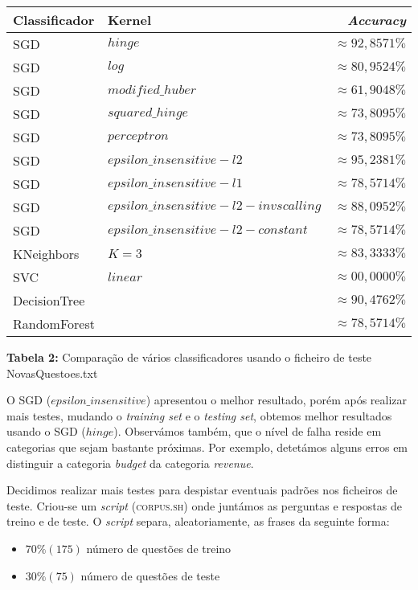 \documentclass[12pt]{article}
\begin{document}
\begin{center}
    \begin{tabular}{ l | l | r }
      \hline
      \textbf{Classificador} & \textbf{Kernel} & \textbf{\textit{Accuracy}} \\ \hline
      SGD & $hinge$ & $\approx 92,8571\%$ \\ \hline
      SGD & $log$ & $\approx 80,9524\%$ \\ \hline
      SGD & $modified\_huber$ & $\approx 61,9048\%$ \\ \hline
      SGD & $squared\_hinge$ & $\approx 73,8095\%$ \\ \hline
      SGD & $perceptron$ & $\approx 73,8095\%$ \\ \hline
      SGD & $epsilon\_insensitive-l2$ & $\approx 95,2381\%$ \\ \hline
      SGD & $epsilon\_insensitive-l1$ & $\approx 78,5714\%$ \\ \hline
      SGD & $epsilon\_insensitive-l2-invscalling$ & $\approx 88,0952\%$ \\ \hline
      SGD & $epsilon\_insensitive-l2-constant$ & $\approx 78,5714\%$ \\ \hline
      KNeighbors & $K = 3$ & $\approx 83,3333\%$ \\ \hline
      SVC & $linear$ & $\approx 00,0000\%$ \\ \hline
      DecisionTree & $ $ & $\approx 90,4762\%$ \\ \hline
      RandomForest & $ $ & $\approx 78,5714\%$ \\ \hline
      
      
    \end{tabular}
  \end{center}
  \textbf{Tabela 2:} Comparação de vários classificadores usando o ficheiro de teste NovasQuestoes.txt \newline

  O SGD ($epsilon\_insensitive$) apresentou o melhor resultado, porém após realizar mais testes, mudando
o \textit{training set} e o \textit{testing set}, obtemos melhor resultados usando o SGD ($hinge$).
Observámos também, que o nível de falha reside em categorias que sejam bastante próximas. Por exemplo, 
detetámos alguns erros em distinguir a categoria \textit{budget} da categoria \textit{revenue}. \newline

Decidimos realizar mais testes para despistar eventuais padrões nos ficheiros de teste. Criou-se um \textit{script}
(\textsc{corpus.sh}) onde juntámos as perguntas e respostas de treino e de teste.
O \textit{script} separa, aleatoriamente, as frases da seguinte forma:
\begin{itemize}
  \item{$70\% (175)$ número de questões de treino}
  \item{$30\% (75)$ número de questões de teste}
\end{itemize}
\end{document}
